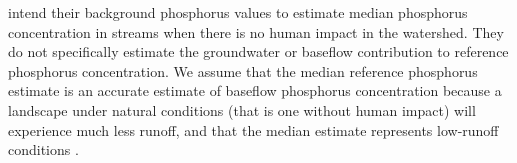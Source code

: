 	\citet{robertson_wadeable_2006} intend their background phosphorus values to estimate median phosphorus concentration in streams when there is no human impact in the watershed. They do not specifically estimate the groundwater or baseflow contribution to reference phosphorus concentration. We assume that the median reference phosphorus estimate is an accurate estimate of baseflow phosphorus concentration because a landscape under natural conditions (that is one without human impact) will experience much less runoff, and that the median estimate represents low-runoff conditions .